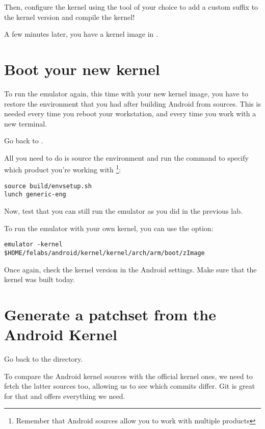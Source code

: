 Then, configure the kernel using the tool of your choice to add a
custom suffix to the kernel version and compile the kernel!


A few minutes later, you have a kernel image in .

\section{Boot your new kernel}

To run the emulator again, this time with your new kernel image, you
have to restore the environment that you had after building Android
from sources. This is needed every time you reboot your workstation,
and every time you work with a new terminal.

Go back to .

All you need to do is source the environment and run the 
command to specify which product you're working with
\footnote{Remember that Android sources allow you to work with
  multiple products}:

\begin{verbatim}
source build/envsetup.sh
lunch generic-eng
\end{verbatim}

Now, test that you can still run the emulator as you did in the
previous lab.

To run the emulator with your own kernel, you can use the
 option:

\begin{verbatim}
emulator -kernel $HOME/felabs/android/kernel/kernel/arch/arm/boot/zImage
\end{verbatim}

Once again, check the kernel version in the Android settings. Make
sure that the kernel was built today.

\section{Generate a patchset from the Android Kernel}

Go back to the  directory.

To compare the Android kernel sources with the official kernel ones,
we need to fetch the latter sources too, allowing us to see which
commits differ. Git is great for that and offers everything we need.

